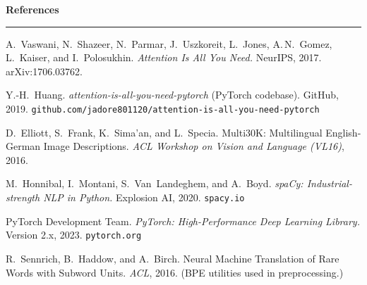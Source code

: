 \documentclass[10pt,twocolumn]{article}
\newcommand{\refsheading}{%
  \vspace{4pt}%
  {\normalfont\normalsize\bfseries\color{navy}References}%
  \vspace{-4pt}\par\textcolor{dgray}{\hrule}\vspace{2pt}%
}
\begin{document}
\refsheading
\begingroup
\small
\begin{enumerate}[label={[\arabic*]},leftmargin=*,itemsep=3pt,
                  topsep=2pt,parsep=0pt]
  \item A.~Vaswani, N.~Shazeer, N.~Parmar, J.~Uszkoreit, L.~Jones,
    A.\,N.~Gomez, L.~Kaiser, and I.~Polosukhin.
    \textit{Attention Is All You Need.}
    NeurIPS, 2017. arXiv:1706.03762.
  \item Y.-H.~Huang.
    \textit{attention-is-all-you-need-pytorch} (PyTorch codebase).
    GitHub, 2019. \texttt{github.com/jadore801120/attention-is-all-you-need-pytorch}
  \item D.~Elliott, S.~Frank, K.~Sima'an, and L.~Specia.
    Multi30K: Multilingual English-German Image Descriptions.
    \textit{ACL Workshop on Vision and Language (VL16)}, 2016.
  \item M.~Honnibal, I.~Montani, S.~Van~Landeghem, and A.~Boyd.
    \textit{spaCy: Industrial-strength NLP in Python.}
    Explosion AI, 2020. \texttt{spacy.io}
  \item PyTorch Development Team.
    \textit{PyTorch: High-Performance Deep Learning Library.}
    Version 2.x, 2023. \texttt{pytorch.org}
  \item R.~Sennrich, B.~Haddow, and A.~Birch.
    Neural Machine Translation of Rare Words with Subword Units.
    \textit{ACL}, 2016. (BPE utilities used in preprocessing.)
\end{enumerate}
\endgroup
\end{document}
